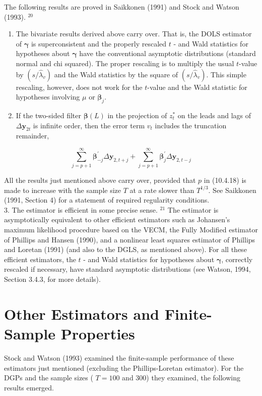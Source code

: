 \documentclass[10pt]{article}
\begin{document}
The following results are proved in Saikkonen (1991) and Stock and Watson (1993). ${ }^{20}$

\begin{enumerate}
  \item The bivariate results derived above carry over. That is, the DOLS estimator of $\boldsymbol{\gamma}$ is superconsistent and the properly rescaled $t$ - and Wald statistics for hypotheses about $\boldsymbol{\gamma}$ have the conventional asymptotic distributions (standard normal and chi squared). The proper rescaling is to multiply the usual $t$-value by $\left(s / \hat{\lambda}_{v}\right)$ and the Wald statistics by the square of $\left(s / \hat{\lambda}_{v}\right)$. This simple rescaling, however, does not work for the $t$-value and the Wald statistic for hypotheses involving $\mu$ or $\boldsymbol{\beta}_{j}$.
  \item If the two-sided filter $\boldsymbol{\beta}(L)$ in the projection of $z_{t}^{*}$ on the leads and lags of $\Delta \mathbf{y}_{2 t}$ is infinite order, then the error term $v_{t}$ includes the truncation remainder,
\end{enumerate}

$$
\sum_{j=p+1}^{\infty} \boldsymbol{\beta}_{-j}^{\prime} \Delta \mathbf{y}_{2, t+j}+\sum_{j=p+1}^{\infty} \boldsymbol{\beta}_{j}^{\prime} \Delta \mathbf{y}_{2, t-j}
$$

All the results just mentioned above carry over, provided that $p$ in (10.4.18) is made to increase with the sample size $T$ at a rate slower than $T^{1 / 3}$. See Saikkonen (1991, Section 4) for a statement of required regularity conditions.\\
3. The estimator is efficient in some precise sense. ${ }^{21}$ The estimator is asymptotically equivalent to other efficient estimators such as Johansen's maximum likelihood procedure based on the VECM, the Fully Modified estimator of Phillips and Hansen (1990), and a nonlinear least squares estimator of Phillips and Loretan (1991) (and also to the DGLS, as mentioned above). For all these efficient estimators, the $t$ - and Wald statistics for hypotheses about $\boldsymbol{\gamma}$, correctly rescaled if necessary, have standard asymptotic distributions (see Watson, 1994, Section 3.4.3, for more details).

\section*{Other Estimators and Finite-Sample Properties}
Stock and Watson (1993) examined the finite-sample performance of these estimators just mentioned (excluding the Phillips-Loretan estimator). For the DGPs and the sample sizes ( $T=100$ and 300) they examined, the following results emerged.
\end{document}
